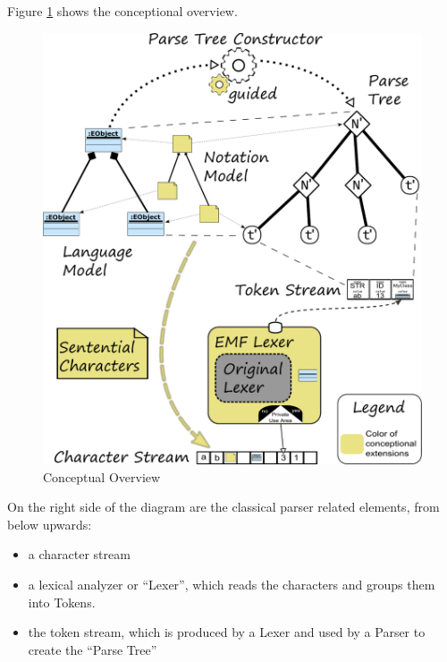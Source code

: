 Figure \ref{ConceptFigure} shows the conceptional overview. 

\begin{figure}
\centering
\includegraphics[scale=0.75]{gfx/ex/Concept} 
\caption{Conceptual Overview}
\label{ConceptFigure}
\end{figure}

On the right side of the diagram are the classical parser related elements, from below upwards:
\begin{itemize}
	\item a character stream
	\item a lexical analyzer or ``Lexer'', which reads the characters and groups them into Tokens.
	\item the token stream, which is produced by a Lexer and used by a Parser to create the ``Parse Tree''
\end{itemize}


